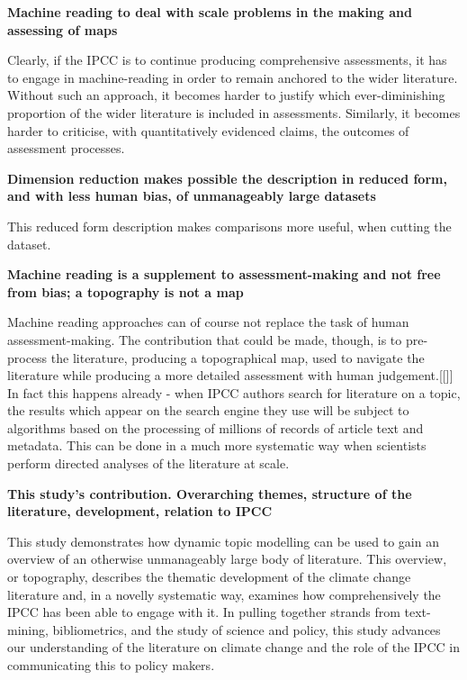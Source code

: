 \documentclass{article}
\begin{document}
\bigskip
\noindent\textbf{Machine reading to deal with scale problems in the making and assessing of maps}


Clearly, if the IPCC is to continue producing comprehensive assessments, it has to engage in machine-reading in order to remain anchored to the wider literature. Without such an approach, it becomes harder to justify which ever-diminishing proportion of the wider literature is included in assessments. Similarly, it becomes harder to criticise, with quantitatively evidenced claims, the outcomes of assessment processes.


\bigskip
\noindent\textbf{Dimension reduction makes possible the description in reduced form, and with less human bias, of unmanageably large datasets}

\citep{Greene2016} \citep{Lee1999}

This reduced form description makes comparisons more useful, when cutting the dataset.

\bigskip
\noindent\textbf{Machine reading is a supplement to assessment-making and not free from bias; a topography is not a map}

Machine reading approaches can of course not replace the task of human assessment-making. The contribution that could be made, though, is to pre-process the literature, producing a topographical map, used to navigate the literature while producing a more detailed assessment with human judgement.[[]] In fact this happens already - when IPCC authors search for literature on a topic, the results which appear on the search engine they use will be subject to algorithms based on the processing of millions of records of article text and metadata. This can be done in a much more systematic way when scientists perform directed analyses of the literature at scale.


\bigskip
\noindent\textbf{This study's contribution. Overarching themes, structure of the literature, development, relation to IPCC}

This study demonstrates how dynamic topic modelling can be used to gain an overview of an otherwise unmanageably large body of literature. This overview, or topography, describes the thematic development of the climate change literature and, in a novelly systematic way, examines how  comprehensively the IPCC has been able to engage with it. In pulling together strands from text-mining, bibliometrics, and the study of science and policy, this study advances our understanding of the literature on climate change and the role of the IPCC in communicating this to policy makers.
\end{document}
